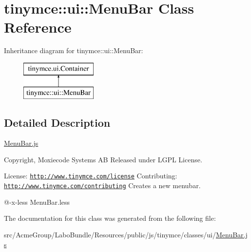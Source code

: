 \hypertarget{classtinymce_1_1ui_1_1_menu_bar}{\section{tinymce\+:\+:ui\+:\+:Menu\+Bar Class Reference}
\label{classtinymce_1_1ui_1_1_menu_bar}
}
Inheritance diagram for tinymce\+:\+:ui\+:\+:Menu\+Bar\+:\begin{figure}[H]
\begin{center}
\leavevmode
\includegraphics[height=2.000000cm]{classtinymce_1_1ui_1_1_menu_bar}
\end{center}
\end{figure}


\subsection{Detailed Description}
\hyperlink{_menu_bar_8js}{Menu\+Bar.\+js}

Copyright, Moxiecode Systems A\+B Released under L\+G\+P\+L License.

License\+: \href{http://www.tinymce.com/license}{\tt http\+://www.\+tinymce.\+com/license} Contributing\+: \href{http://www.tinymce.com/contributing}{\tt http\+://www.\+tinymce.\+com/contributing} Creates a new menubar.

@-\/x-\/less Menu\+Bar.\+less 

The documentation for this class was generated from the following file\+:\begin{DoxyCompactItemize}
\item 
src/\+Acme\+Group/\+Labo\+Bundle/\+Resources/public/js/tinymce/classes/ui/\hyperlink{_menu_bar_8js}{Menu\+Bar.\+js}\end{DoxyCompactItemize}
